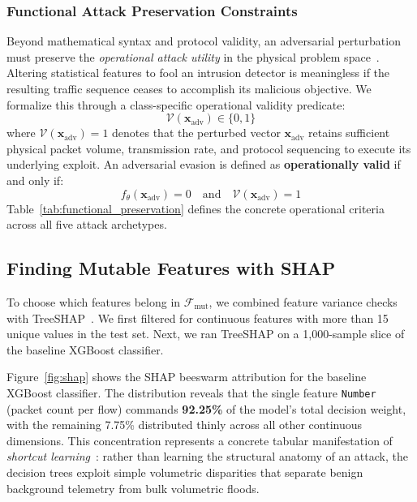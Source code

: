 \documentclass[iicol,pdflatex,sn-mathphys-num]{sn-jnl}
\begin{document}
\subsubsection{Functional Attack Preservation Constraints}
Beyond mathematical syntax and protocol validity, an adversarial perturbation must preserve the \textit{operational attack utility} in the physical problem space~\cite{sommer2010outside,pierazzi2020intriguing}. Altering statistical features to fool an intrusion detector is meaningless if the resulting traffic sequence ceases to accomplish its malicious objective. We formalize this through a class-specific operational validity predicate:
\begin{equation}
    \mathcal{V}(\mathbf{x}_{\text{adv}}) \in \{0, 1\}
\end{equation}
where $\mathcal{V}(\mathbf{x}_{\text{adv}}) = 1$ denotes that the perturbed vector $\mathbf{x}_{\text{adv}}$ retains sufficient physical packet volume, transmission rate, and protocol sequencing to execute its underlying exploit. An adversarial evasion is defined as \textbf{operationally valid} if and only if:
\begin{equation}
    f_\theta(\mathbf{x}_{\text{adv}}) = 0 \quad \text{and} \quad \mathcal{V}(\mathbf{x}_{\text{adv}}) = 1
\end{equation}
Table~\ref{tab:functional_preservation} defines the concrete operational criteria across all five attack archetypes.

\subsection{Finding Mutable Features with SHAP}
\label{sec:shap}
To choose which features belong in $\mathcal{F}_{\text{mut}}$, we combined feature variance checks with TreeSHAP~\cite{lundberg2017shap}. We first filtered for continuous features with more than 15 unique values in the test set. Next, we ran TreeSHAP on a 1,000-sample slice of the baseline XGBoost classifier.

Figure~\ref{fig:shap} shows the SHAP beeswarm attribution for the baseline XGBoost classifier. The distribution reveals that the single feature \texttt{Number} (packet count per flow) commands \textbf{92.25\%} of the model's total decision weight, with the remaining 7.75\% distributed thinly across all other continuous dimensions. This concentration represents a concrete tabular manifestation of \textit{shortcut learning}~\cite{geirhos2020shortcut}: rather than learning the structural anatomy of an attack, the decision trees exploit simple volumetric disparities that separate benign background telemetry from bulk volumetric floods.
\end{document}
